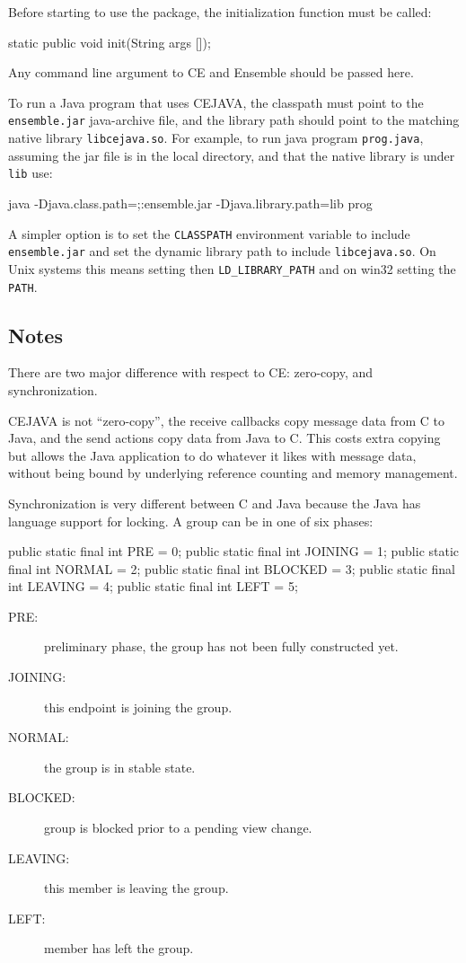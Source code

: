 Before starting to use the package, the initialization function must
be called: 

\begin{codebox}
    static public void init(String args []);
\end{codebox}

Any command line argument to CE and Ensemble should be passed here. 

To run a Java program that uses CEJAVA, the classpath must point to
the {\tt ensemble.jar} java-archive file, and the library path should
point to the matching native library {\tt libcejava.so}. For example,
to run java program {\tt prog.java}, assuming the jar file is in the
local directory, and that the native library is under {\tt lib} use:
\begin{codebox}
    java -Djava.class.path=;:ensemble.jar -Djava.library.path=lib prog
\end{codebox}
A simpler option is to set the {\tt CLASSPATH} environment variable to
include {\tt ensemble.jar} and set the dynamic library path to include
{\tt libcejava.so}. On Unix systems this means setting then
{\tt LD\_LIBRARY\_PATH} and on win32 setting the {\tt PATH}.

\subsection{Notes}
There are two major difference with respect to CE: zero-copy, and
synchronization. 

CEJAVA is not ``zero-copy'', the receive callbacks copy message data
from C to Java, and the send actions copy data from Java to C. This
costs extra copying but allows the Java application to do whatever it
likes with message data, without being bound by underlying reference
counting and memory management. 

Synchronization is very different between C and Java because the Java
has language support for locking. A group can be in one of six phases: 
\begin{codebox}
    public static final int PRE     = 0;
    public static final int JOINING = 1;
    public static final int NORMAL  = 2;
    public static final int BLOCKED = 3;
    public static final int LEAVING = 4;
    public static final int LEFT    = 5;
\end{codebox}

\begin{description}
\item[PRE:] preliminary phase, the group has not been fully
  constructed yet. 
\item[JOINING:] this endpoint is joining the group. 
\item[NORMAL:] the group is in stable state. 
\item[BLOCKED:] group is blocked prior to a pending view change. 
\item[LEAVING:] this member is leaving the group. 
\item[LEFT:] member has left the group. 
\end{description}


